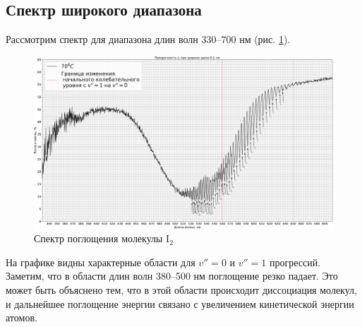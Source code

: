 \subsection{Спектр широкого диапазона}
Рассмотрим спектр для диапазона длин волн 330--700 нм (рис. \ref{long_spectrum}).
\begin{figure}[H]
	\centering
	\includegraphics[angle = 90, height=0.87\textheight]{data/long_spectrum}
	\caption{Спектр поглощения молекулы I$_2$}
	\label{long_spectrum}
\end{figure}
На графике видны характерные области для $v'' = 0$ и $v'' = 1$ прогрессий. Заметим, что в области длин волн 380--500 нм поглощение резко падает. Это может быть объяснено тем, что в этой области происходит диссоциация молекул, и дальнейшее поглощение энергии связано с увеличением кинетической энергии атомов.


